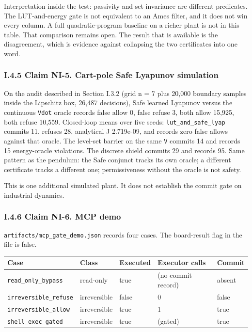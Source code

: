 \documentclass[
  10pt,
]{article}
\newcounter{none} %
\begin{document}
Interpretation inside the test: passivity and set invariance are
different predicates. The LUT-and-energy gate is not equivalent to an
Ames filter, and it does not win every column. A full quadratic-program
baseline on a richer plant is not in this table. That comparison remains
open. The result that is available is the disagreement, which is
evidence against collapsing the two certificates into one word.

\subsubsection{I.4.5 Claim NI-5. Cart-pole Safe Lyapunov
simulation}\label{i.4.5-claim-ni-5.-cart-pole-safe-lyapunov-simulation}

On the audit described in Section I.3.2 (grid n = 7 plus 20,000 boundary
samples inside the Lipschitz box, 26,487 decisions), Safe learned
Lyapunov versus the continuous \texttt{Vdot} oracle records false allow
0, false refuse 3, both allow 15,925, both refuse 10,559. Closed-loop
means over five seeds: \texttt{lut\_and\_safe\_lyap} commits 11, refuses
28, analytical J 2.719e-09, and records zero false allows against that
oracle. The level-set barrier on the same \texttt{V} commits 14 and
records 15 energy-oracle violations. The discrete shield commits 29 and
records 95. Same pattern as the pendulum: the Safe conjunct tracks its
own oracle; a different certificate tracks a different one;
permissiveness without the oracle is not safety.

This is one additional simulated plant. It does not establish the commit
gate on industrial dynamics.

\subsubsection{I.4.6 Claim NI-6. MCP
demo}\label{i.4.6-claim-ni-6.-mcp-demo}

\texttt{artifacts/mcp\_gate\_demo.json} records four cases. The
board-result flag in the file is false.

{\def\LTcaptype{none} %
\begin{longtable}[]{@{}lllll@{}}
\toprule\noalign{}
Case & Class & Executed & Executor calls & Commit \\
\midrule\noalign{}
\endhead
\bottomrule\noalign{}
\endlastfoot
\texttt{read\_only\_bypass} & read-only & true & (no commit record) &
absent \\
\texttt{irreversible\_refuse} & irreversible & false & 0 & false \\
\texttt{irreversible\_allow} & irreversible & true & 1 & true \\
\texttt{shell\_exec\_gated} & irreversible & true & (gated) & true \\
\end{longtable}
}
\end{document}
